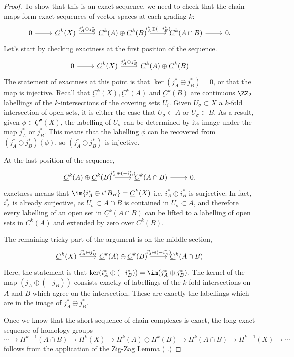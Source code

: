 \begin{proof}
To show that this is an exact sequence, we need to check that the chain maps form exact sequences of vector spaces at each grading $k$:
\[\begin{tikzcd}
0 \arrow{r} & \underline C^k(X)\arrow{r}{j^*_A\oplus j^*_B} & \underline C^k(A)\oplus \underline C^k(B) \arrow{r}{i^*_A\oplus (-i^*_B)} & \underline C^k(A\cap B)\arrow{r} & 0.
\end{tikzcd}\]
Let's start by checking exactness at the first position of the sequence. 
\[\begin{tikzcd}
	0 \arrow{r} & \underline C^k(X)\arrow{r}{j^*_A\oplus j^*_B} & \underline C^k(A)\oplus \underline C^k(B) 
\end{tikzcd}\]
The statement of exactness at this point is that $\ker (j^*_A\oplus j^*_B)=0$, or that the map is injective.
Recall that $\underbar C^k(X), \underbar C^k(A)$ and $\underbar C^k(B)$ are continuous $\ZZ_2$ labellings of the $k$-intersections of the covering sets $U_i$. 
Given $U_\sigma\subset X$ a $k$-fold intersection of open sets, it is either the case that $U_\sigma \subset A$ or $U_\sigma \subset B$.
As a result, given $\phi\in \underline C^\bullet(X)$, the labelling of $U_\sigma$ can be determined by its image under the map $j^*_A$ or $j^*_B$. 
This means that the labelling $\phi$ can be recovered from $(j^*_A\oplus j^*_B)(\phi)$, so $(j^*_A\oplus j^*_B)$ is injective. 

At the last position of the sequence, 
\[
\begin{tikzcd}
	\underline C^k(A)\oplus \underline C^k(B) \arrow{r}{i^*_A\oplus (-i^*_B)} & \underline C^k(A\cap B)\arrow{r} & 0.
\end{tikzcd}\]
exactness means that $\im{i^*_A\oplus i^*B_B}=\underline C^k(X)$ i.e. $i^*_A\oplus i^*_B$ is surjective. In fact, $i^*_A$ is already surjective, as $U_\sigma\subset A\cap B$ is contained in $U_\sigma\subset A$, and therefore every labelling of an open set in $\underline C^k(A\cap B)$ can be lifted to a labelling of open sets in $\underline C^k(A)$ and extended by zero over $\underline C^k(B)$. 

The remaining tricky part of the argument is on the middle section, 
\[ \begin{tikzcd} 
\underline C^k(X)\arrow{r}{j^*_A\oplus j^*_B} & \underline C^k(A)\oplus \underline C^k(B) \arrow{r}{i^*_A\oplus (-i^*_B)} & \underline C^k(A\cap B)
\end{tikzcd}\]
Here, the statement is that $\ker(i^*_A\oplus(- i^*_B))=\im (j^*_A\oplus j^*_B). $ The kernel of the map $(j_A\oplus(- j_B))$ consists exactly of labellings of the $k$-fold intersections on $A$ and $B$ which agree on the intersection.
These are exactly the labellings which are in the image of $j^*_A\oplus j^*_B$. 

Once we know that the short sequence of chain complexes is exact, the long exact sequence of homology groups
\[\cdots\to  H^{k-1}(A\cap B)\to H^k(X)\to H^k(A)\oplus H^k(B)\to H^k(A\cap B)\to H^{k+1} (X)\to \cdots \]
 follows from the application of the Zig-Zag Lemma ( .)
\end{proof}
